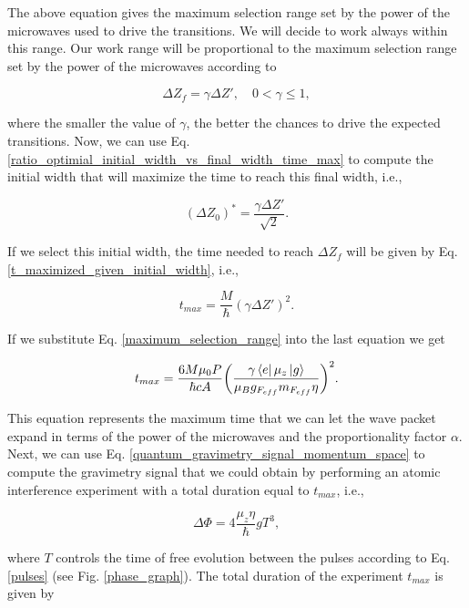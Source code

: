\documentclass{article}
\begin{document}
The above equation gives the maximum selection range set by the power of the microwaves used to drive the transitions. We will decide to work always within this range. Our work range will be proportional to the maximum selection range set by the power of the microwaves according to

\begin{equation}
    \Delta Z_{f} = \gamma \Delta Z' \mathrm{,} \quad 0 < \gamma \leq 1,
\end{equation}

where the smaller the value of $\gamma$, the better the chances to drive the expected transitions. Now, we can use Eq. \ref{ratio_optimial_initial_width_vs_final_width_time_max} to compute the initial width that will maximize the time to reach this final width, i.e.,

\begin{equation}
    (\Delta Z_{0})^{\ast} = \frac{\gamma \Delta Z'}{\sqrt{2}}.
\end{equation}

If we select this initial width, the time needed to reach $\Delta Z_{f}$ will be given by Eq. \ref{t_maximized_given_initial_width}, i.e.,

\begin{equation}
    t_{max} = \frac{M}{\hbar} (\gamma \Delta Z')^2.
\end{equation}

If we substitute Eq. \ref{maximum_selection_range} into the last equation we get

\begin{equation}\label{total_experiment_time}
    t_{max} = \frac{6 M \mu_{0} P}{\hbar c A} \bigg(\frac{ \gamma  \bra{e} \mu_{z} \ket{g}}{\mu_{B} g_{F_{eff}} m_{F_{eff}} \eta}\bigg)^{2}.
\end{equation}

This equation represents the maximum time that we can let the wave packet expand in terms of the power of the microwaves and the proportionality factor $\alpha$. Next, we can use Eq. \ref{quantum_gravimetry_signal_momentum_space} to compute the gravimetry signal that we could obtain by performing an atomic interference experiment with a total duration equal to $t_{max}$, i.e., 

\begin{equation}\label{gravimetry_signal_T}
    \Delta \Phi = 4 \frac{\mu_{z} \eta }{\hbar} g T^{3},
\end{equation}

where $T$ controls the time of free evolution between the pulses according to Eq. \ref{pulses} (see Fig. \ref{phase_graph}). The total duration of the experiment $t_{max}$ is given by
\end{document}
